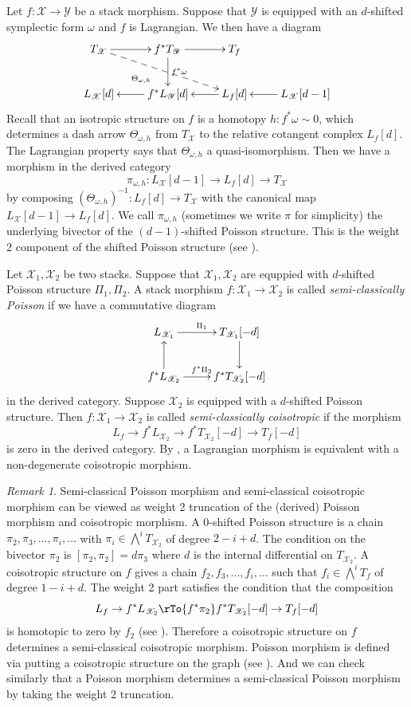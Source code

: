 \documentclass[reqno]{amsart}
\theoremstyle{definition}
\theoremstyle{remark}
\newtheorem{remark}[theorem]{Remark}
\newcommand{\sX}{\mathscr{X}}
\newcommand{\sY}{\mathscr{Y}}
\numberwithin{equation}{section}
\begin{document}
Let $f:\sX\to \sY$ be a stack morphism. Suppose that $\sY$ is equipped with an $d$-shifted symplectic form $\omega$ and $f$ is Lagrangian. We then have a diagram
\begin{align}\label{dig:bivector}
\xymatrix{
T_\sX\ar[r]\ar@{-->}[rrd]_{\Theta_{\omega,h} \hspace{1cm}} & f^*T_{\sY}\ar[r]\ar[d]^{f^*\omega} & T_f \\
L_\sX[d]& f^*L_\sY[d]\ar[l] &L_f[d]\ar[l] & L_\sX[d-1]\ar[l]
}
\end{align}
Recall that an isotropic structure on $f$ is a homotopy $h: f^*\omega \sim 0$, which determines a dash arrow $\Theta_{\omega,h}$ from $T_\sX$ to the relative cotangent complex $L_f[d]$. The Lagrangian property says that $\Theta_{\omega,h}$ a quasi-isomorphism. Then we have a morphism in the derived category
\[
\pi_{\omega,h}: L_\sX[d-1]\to L_f[d]\to T_\sX
\] by composing $(\Theta_{\omega,h})^{-1}: L_f[d]\to T_{\sX}$ with the canonical map $L_\sX[d-1]\to L_f[d]$. We call $\pi_{\omega,h}$ (sometimes we write $\pi$ for simplicity) the underlying bivector of the $(d-1)$-shifted Poisson structure. This is the weight 2 component of the shifted Poisson structure (see \cite[Section 4.1]{MS2}). 

Let $\sX_1, \sX_2$ be two stacks.  Suppose that $\sX_1, \sX_2$ are equppied with $d$-shifted Poisson structure $\Pi_1, \Pi_2$. A stack morphism $f:\sX_1\to \sX_2$ is called \emph{semi-classically Poisson}  if we have a commutative diagram
\[
\xymatrix{
L_{\sX_1}\ar[r]^{\Pi_1} & T_{\sX_1}[-d]\ar[d] \\
f^*L_{\sX_2}\ar[u]\ar[r]^{f^*\Pi_2} & f^*T_{\sX_2}[-d]
}
\] in the derived category. Suppose $\sX_2$ is equipped with a $d$-shifted Poisson structure. Then $f:\sX_1\to \sX_2$ is called \emph{semi-classically coisotropic}  if the morphism 
\[
L_f\to f^*L_{\sX_2}\to f^*T_{\sX_2}[-d]\to T_f[-d]
\]
is zero in the derived category.
 By \cite[Theorem 4.22]{MS2}, a Lagrangian morphism is equivalent with a non-degenerate coisotropic morphism.
\begin{remark} 
Semi-classical Poisson morphism and semi-classical coisotropic morphism can be viewed as weight 2 truncation of the (derived) Poisson morphism and coisotropic morphism. A  0-shifted Poisson structure  is  a chain $\pi_2,\pi_3,\ldots, \pi_i,\ldots$ with $\pi_i\in \bigwedge^i T_{\sX_2}$ of degree $2-i+d$. The condition on the bivector $\pi_2$ is $[\pi_2,\pi_2]=d\pi_3$ where $d$ is the internal differential on $T_{\sX_2}$.  A coisotropic structure on $f$ gives a chain $f_2,f_3,\ldots,f_i,\ldots$ such that $f_i\in \bigwedge^i T_f$ of degree $1-i+d$. The weight 2 part satisfies the condition that the composition 
\[
L_f\to f^*L_{\sX_2}\rTo{f^*\pi_2} f^*T_{\sX_2}[-d]\to T_f[-d]
\] is homotopic to zero by $f_2$ (see \cite[Theorem 2.7]{MS2}). Therefore a coisotropic structure on $f$ determines a semi-classical coisotropic morphism. 
Poisson morphism is defined via putting a coisotropic structure on the graph (see \cite[Theorem 2.9]{MS2}). And we can check similarly that a Poisson morphism determines a semi-classical Poisson morphism by taking the weight 2 truncation.
\end{remark}
\end{document}

